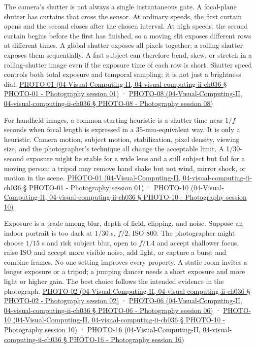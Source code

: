 The camera's shutter is not always a single instantaneous gate. A focal-plane shutter has curtains that cross the sensor. At ordinary speeds, the first curtain opens and the second closes after the chosen interval. At high speeds, the second curtain begins before the first has finished, so a moving slit exposes different rows at different times. A global shutter exposes all pixels together; a rolling shutter exposes them sequentially. A fast subject can therefore bend, skew, or stretch in a rolling-shutter image even if the exposure time of each row is short. Shutter speed controls both total exposure and temporal sampling; it is not just a brightness dial. \href{}{PHOTO-01 (04-Visual-Computing-II, 04-visual-computing-ii-ch036 § PHOTO-01 - Photography session 01)} · \href{}{PHOTO-08 (04-Visual-Computing-II, 04-visual-computing-ii-ch036 § PHOTO-08 - Photography session 08)}

For handheld images, a common starting heuristic is a shutter time near \(1/f\) seconds when focal length is expressed in a 35-mm-equivalent way. It is only a heuristic. Camera motion, subject motion, stabilization, pixel density, viewing size, and the photographer's technique all change the acceptable limit. A 1/30-second exposure might be stable for a wide lens and a still subject but fail for a moving person; a tripod may remove hand shake but not wind, mirror shock, or motion in the scene. \href{}{PHOTO-01 (04-Visual-Computing-II, 04-visual-computing-ii-ch036 § PHOTO-01 - Photography session 01)} · \href{}{PHOTO-10 (04-Visual-Computing-II, 04-visual-computing-ii-ch036 § PHOTO-10 - Photography session 10)}

Exposure is a trade among blur, depth of field, clipping, and noise. Suppose an indoor portrait is too dark at \(1/30\) s, \(f/2\), ISO 800. The photographer might choose \(1/15\) s and risk subject blur, open to \(f/1.4\) and accept shallower focus, raise ISO and accept more visible noise, add light, or capture a burst and combine frames. No one setting improves every property. A static room invites a longer exposure or a tripod; a jumping dancer needs a short exposure and more light or higher gain. The best choice follows the intended evidence in the photograph. \href{}{PHOTO-02 (04-Visual-Computing-II, 04-visual-computing-ii-ch036 § PHOTO-02 - Photography session 02)} · \href{}{PHOTO-06 (04-Visual-Computing-II, 04-visual-computing-ii-ch036 § PHOTO-06 - Photography session 06)} · \href{}{PHOTO-10 (04-Visual-Computing-II, 04-visual-computing-ii-ch036 § PHOTO-10 - Photography session 10)} · \href{}{PHOTO-16 (04-Visual-Computing-II, 04-visual-computing-ii-ch036 § PHOTO-16 - Photography session 16)}

